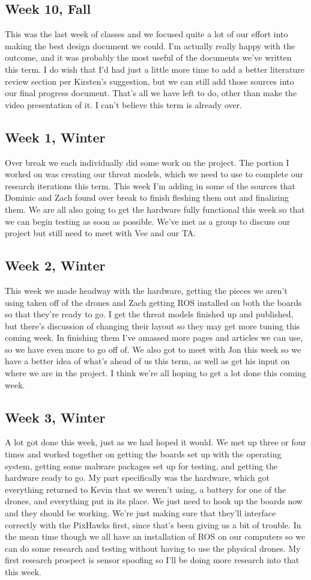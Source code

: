 \subsection{Week 10, Fall}
This was the last week of classes and we focused quite a lot of our effort into making the best design document we could. I'm actually really happy with the outcome, and it was probably the most useful of the documents we've written this term. I do wish that I'd had just a little more time to add a better literature review section per Kirsten's suggestion, but we can still add those sources into our final progress document. That's all we have left to do, other than make the video presentation of it. I can't believe this term is already over.
\subsection{Week 1, Winter}
Over break we each individually did some work on the project. The portion I worked on was creating our threat models, which we need to use to complete our research iterations this term. This week I'm adding in some of the sources that Dominic and Zach found over break to finish fleshing them out and finalizing them. We are all also going to get the hardware fully functional this week so that we can begin testing as soon as possible. We've met as a group to discuss our project but still need to meet with Vee and our TA.
\subsection{Week 2, Winter}
This week we made headway with the hardware, getting the pieces we aren't using taken off of the drones and Zach getting ROS installed on both the boards so that they're ready to go. I get the threat models finished up and published, but there's discussion of changing their layout so they may get more tuning this coming week. In finishing them I've amassed more pages and articles we can use, so we have even more to go off of. We also got to meet with Jon this week so we have a better idea of what's ahead of us this term, as well as get his input on where we are in the project. I think we're all hoping to get a lot done this coming week.
\subsection{Week 3, Winter}
A lot got done this week, just as we had hoped it would. We met up three or four times and worked together on getting the boards set up with the operating system, getting some malware packages set up for testing, and getting the hardware ready to go. My part specifically was the hardware, which got everything returned to Kevin that we weren't using, a battery for one of the drones, and everything put in its place. We just need to hook up the boards now and they should be working. We're just making sure that they'll interface correctly with the PixHawks first, since that's been giving us a bit of trouble. In the mean time though we all have an installation of ROS on our computers so we can do some research and testing without having to use the physical drones. My first research prospect is sensor spoofing so I'll be doing more research into that this week.
